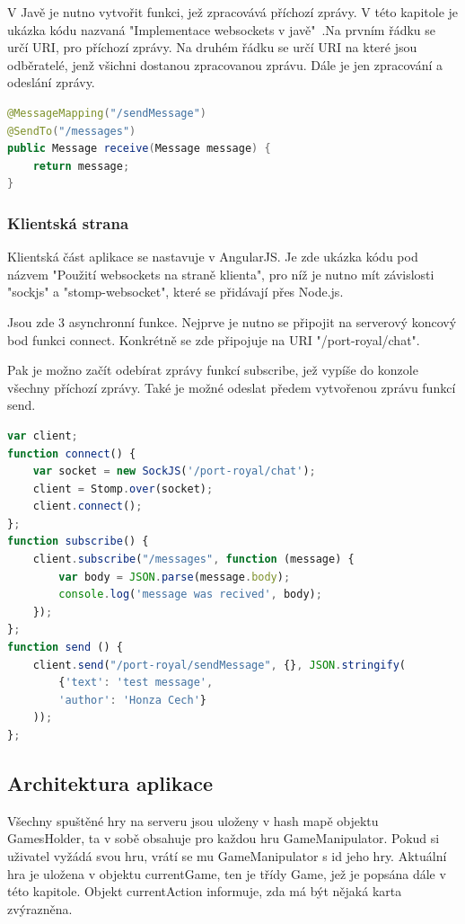 \documentclass[czech,master,public,dept460,male,cpdeclaration,twoside]{diploma}
\begin{document}
V Javě je nutno vytvořit funkci, jež zpracovává příchozí zprávy. V této kapitole je ukázka kódu nazvaná "Implementace websockets v javě"~.Na prvním řádku se určí URI, pro příchozí zprávy. Na druhém řádku se určí URI na které jsou odběratelé, jenž všichni dostanou zpracovanou zprávu. Dále je jen zpracování a odeslání zprávy.\\

\begin{lstlisting}[language=Java, caption=Implementace websockets v javě]
@MessageMapping("/sendMessage")
@SendTo("/messages")
public Message receive(Message message) {
    return message;
}
\end{lstlisting}

\subsubsection{Klientská strana}
Klientská část aplikace se nastavuje v AngularJS. Je zde ukázka kódu pod názvem "Použití websockets na straně klienta", pro níž je nutno mít závislosti "sockjs" a "stomp-websocket", které se přidávají přes Node.js.

Jsou zde 3 asynchronní funkce. Nejprve je nutno se připojit na serverový koncový bod funkci connect. Konkrétně se zde připojuje na URI "/port-royal/chat". 

Pak je možno začít odebírat zprávy funkcí subscribe, jež vypíše do konzole všechny příchozí zprávy. Také je možné odeslat předem vytvořenou zprávu funkcí send.
\\
\begin{lstlisting}[language=JavaScript, caption=Použití websockets na straně klienta]
var client;      
function connect() {
    var socket = new SockJS('/port-royal/chat');
    client = Stomp.over(socket);
    client.connect();
};
function subscribe() {
    client.subscribe("/messages", function (message) {
        var body = JSON.parse(message.body);
        console.log('message was recived', body);
    });
};
function send () {
    client.send("/port-royal/sendMessage", {}, JSON.stringify(
        {'text': 'test message',
        'author': 'Honza Cech'}
    ));
};
\end{lstlisting}

\subsection{Architektura aplikace}
Všechny spuštěné hry na serveru jsou uloženy v hash mapě objektu GamesHolder, ta v sobě obsahuje pro každou hru GameManipulator. Pokud si uživatel vyžádá svou hru, vrátí se mu GameManipulator s id jeho hry. Aktuální hra je uložena v objektu currentGame, ten je třídy Game, jež je popsána dále v této kapitole. Objekt currentAction informuje, zda má být nějaká karta zvýrazněna.
\end{document}
